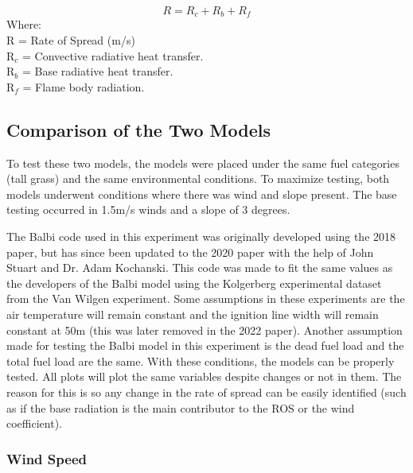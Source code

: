 \documentclass{article}
\begin{document}
\begin{equation}
	R = R_c + R_b + R_f
	\label{Balbi ROS equation}
\end{equation}
Where: \\
\noindent R = Rate of Spread (m/s) \\
R$_c$ = Convective radiative heat transfer.\\
R$_b$ = Base radiative heat transfer.\\
R$_f$ = Flame body radiation. 
\subsection{Comparison of the Two Models}
\indent To test these two models, the models were placed under the same fuel categories (tall grass) and the same environmental conditions. To maximize testing, both models underwent conditions where there was wind and slope present. The base testing occurred in 1.5m/s winds and a slope of 3 degrees. 

The Balbi code used in this experiment was originally developed using the 2018 paper, but has since been updated to the 2020 paper with the help of John Stuart and Dr. Adam Kochanski. This code was made to fit the same values as the developers of the Balbi model using the Kolgerberg experimental dataset from the Van Wilgen experiment. Some assumptions in these experiments are the air temperature will remain constant and the ignition line width will remain constant at 50m (this was later removed in the 2022 paper). Another assumption made for testing the Balbi model in this experiment is the dead fuel load and the total fuel load are the same. With these conditions, the models can be properly tested. All plots will plot the same variables despite changes or not in them. The reason for this is so any change in the rate of spread can be easily identified (such as if the base radiation is the main contributor to the ROS or the wind coefficient). 
\subsubsection{Wind Speed}
\end{document}
